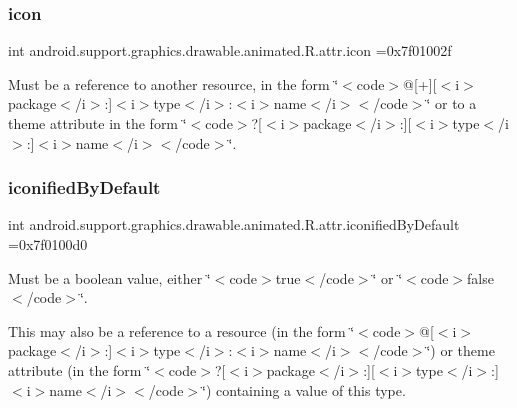 \subsubsection{\texorpdfstring{icon}{icon}}
{\footnotesize\ttfamily int android.\+support.\+graphics.\+drawable.\+animated.\+R.\+attr.\+icon =0x7f01002f\hspace{0.3cm}{\ttfamily [static]}}

Must be a reference to another resource, in the form \char`\"{}$<$code$>$@\mbox{[}+\mbox{]}\mbox{[}$<$i$>$package$<$/i$>$\+:\mbox{]}$<$i$>$type$<$/i$>$\+:$<$i$>$name$<$/i$>$$<$/code$>$\char`\"{} or to a theme attribute in the form \char`\"{}$<$code$>$?\mbox{[}$<$i$>$package$<$/i$>$\+:\mbox{]}\mbox{[}$<$i$>$type$<$/i$>$\+:\mbox{]}$<$i$>$name$<$/i$>$$<$/code$>$\char`\"{}. \mbox{\label{classandroid_1_1support_1_1graphics_1_1drawable_1_1animated_1_1R_1_1attr_a08a22e8728de4121210ff34f199f4d55}} 
\subsubsection{\texorpdfstring{iconified\+By\+Default}{iconifiedByDefault}}
{\footnotesize\ttfamily int android.\+support.\+graphics.\+drawable.\+animated.\+R.\+attr.\+iconified\+By\+Default =0x7f0100d0\hspace{0.3cm}{\ttfamily [static]}}

Must be a boolean value, either \char`\"{}$<$code$>$true$<$/code$>$\char`\"{} or \char`\"{}$<$code$>$false$<$/code$>$\char`\"{}. 

This may also be a reference to a resource (in the form \char`\"{}$<$code$>$@\mbox{[}$<$i$>$package$<$/i$>$\+:\mbox{]}$<$i$>$type$<$/i$>$\+:$<$i$>$name$<$/i$>$$<$/code$>$\char`\"{}) or theme attribute (in the form \char`\"{}$<$code$>$?\mbox{[}$<$i$>$package$<$/i$>$\+:\mbox{]}\mbox{[}$<$i$>$type$<$/i$>$\+:\mbox{]}$<$i$>$name$<$/i$>$$<$/code$>$\char`\"{}) containing a value of this type. \mbox{\label{classandroid_1_1support_1_1graphics_1_1drawable_1_1animated_1_1R_1_1attr_a8ba499e5cf419920ff5174c5b6365499}} 
